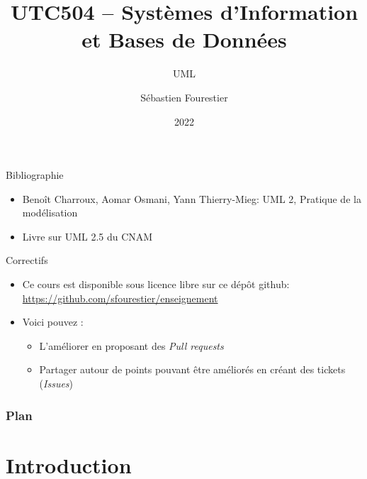 \documentclass[14pt]{beamer}
\title{UTC504 -- Systèmes d'Information et Bases de Données}
\subtitle{UML}
\author{Sébastien Fourestier}
\date{2022}
\begin{document}
\frame{\titlepage}

\begin{framentitle}{Bibliographie}
    \begin{itemize}
        \item Benoît Charroux, Aomar Osmani, Yann Thierry-Mieg: UML 2, Pratique
            de la modélisation
        \item Livre sur UML 2.5 du CNAM  %
    \end{itemize}
\end{framentitle}

\begin{framentitle}{Correctifs}
    \begin{itemize}
        \item Ce cours est disponible sous licence libre sur ce dépôt github:\\
            \small{\url{https://github.com/sfourestier/enseignement}}
        \item[\ra] Voici pouvez :
            \begin{itemize}
                \item L'améliorer en proposant des \emph{Pull requests}
                \item Partager autour de points pouvant être améliorés en créant des
                    tickets (\emph{Issues})
            \end{itemize}
    \end{itemize}
\end{framentitle}

\begin{frame}
    \frametitle{Plan}
    \tableofcontents
\end{frame}


\section{Introduction}


\end{document}
